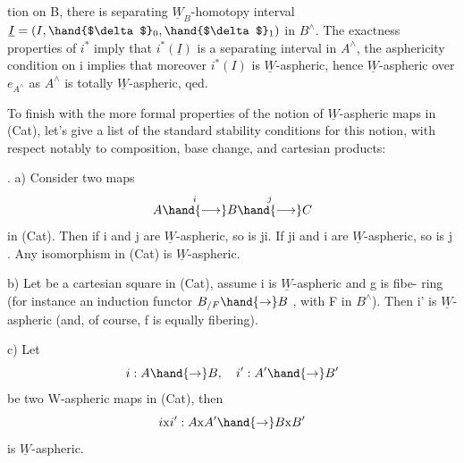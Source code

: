 
tion on B,  there is   separating $\underline{W}_B$-homotopy interval
$\underline{I} = (I,\hand{$\delta$}_0,\hand{$\delta$}_1)$ in $B^\wedge$.  The exactness properties of $i^*$  imply that
$i^*(\underline{I})$  is a separating interval in $A^\wedge$,   the asphericity condition on
i implies that moreover $i^*(I)$ is $\underline{W}$-aspheric,  hence $\underline{W}$-aspheric over $e_{A^\wedge}$
as $A^\wedge$ is  totally $\underline{W}$-aspheric,  qed.

To finish  with the more formal properties of the notion of
$\underline{W}$-aspheric maps in (Cat),  let's give a list of the standard stability
conditions for this notion,  with respect notably to composition,  base
change,  and cartesian products:

\hand{\uline{\textcolor{black}{Proposition 3}}}.   a)  Consider two maps  
\[ A \overset{i}{\hand{\longrightarrow}} B \overset{j}{\hand{\longrightarrow}} C \]
in (Cat).   Then if  i and j are $\underline{W}$-aspheric,  so is ji.  If ji and i are
$\underline{W}$-aspheric,  so is j .  Any isomorphism in (Cat) is $\underline{W}$-aspheric.

b)   Let
be a cartesian square in (Cat),  assume i is $\underline{W}$-aspheric and g is fibe-%
ring  (for instance an induction functor  $B_{/F} \hand{\to} B$ ,  with  F in $B^\wedge$).
Then i' is $\underline{W}$-aspheric  (and, of course,  f is equally fibering).

c)   Let
\[ i: A \hand{\to} B , \quad i' : A' \hand{\to} B' \]
be two W-aspheric maps in (Cat),  then
\[ i\mathrm{x}i' : A\mathrm{x}A' \hand{\to} B\mathrm{x}B' \]
is $\underline{W}$-aspheric.

